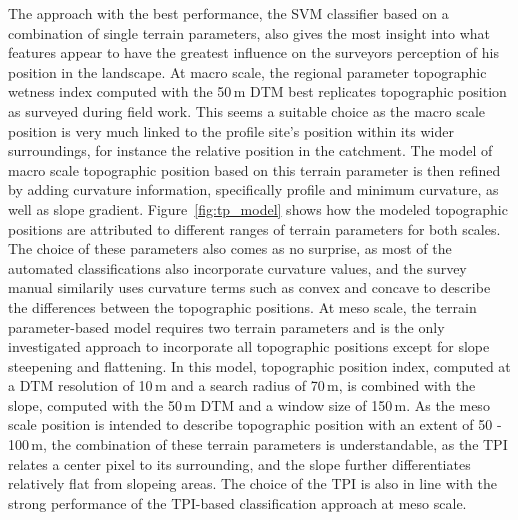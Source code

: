 \documentclass[preprint,12pt,authoryear]{elsarticle}
\begin{document}
The approach with the best performance, the SVM classifier based on a combination of single terrain parameters, also gives the most insight into what features appear to have the greatest influence on the surveyors perception of his position in the landscape. At macro scale, the regional parameter topographic wetness index computed with the 50\,m DTM best replicates topographic position as surveyed during field work. This seems a suitable choice as the macro scale position is very much linked to the profile site's position within its wider surroundings, for instance the relative position in the catchment. The model of macro scale topographic position based on this terrain parameter is then refined by adding curvature information, specifically profile and minimum curvature, as well as slope gradient. Figure~\ref{fig:tp_model} shows how the modeled topographic positions are attributed to different ranges of terrain parameters for both scales. The choice of these parameters also comes as no surprise, as most of the automated classifications also incorporate curvature values, and the survey manual similarily uses curvature terms such as convex and concave to describe the differences between the topographic positions. At meso scale, the terrain parameter-based model requires two terrain parameters and is the only investigated approach to incorporate all topographic positions except for slope steepening and flattening. In this model, topographic position index, computed at a DTM resolution of 10\,m and a search radius of 70\,m, is combined with the slope, computed with the 50\,m DTM and a window size of 150\,m. As the meso scale position is intended to describe topographic position with an extent of 50 - 100\,m, the combination of these terrain parameters is understandable, as the TPI relates a center pixel to its surrounding, and the slope further differentiates relatively flat from slopeing areas. The choice of the TPI is also in line with the strong performance of the TPI-based classification approach at meso scale.
\end{document}

